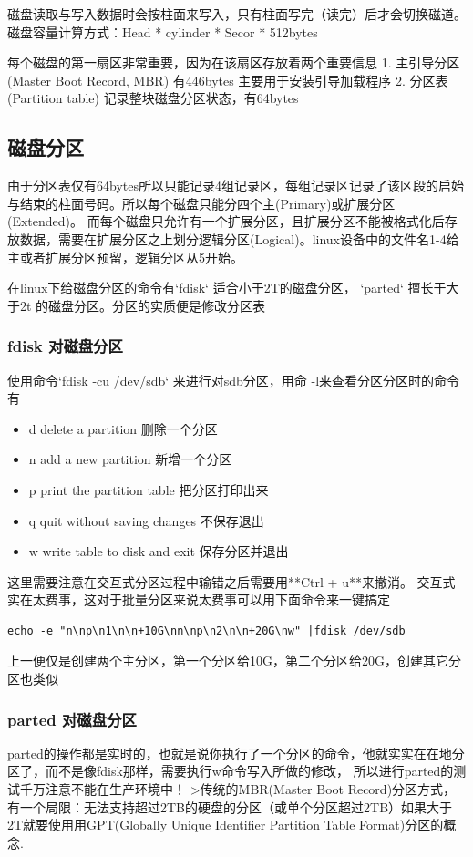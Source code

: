 磁盘读取与写入数据时会按柱面来写入，只有柱面写完（读完）后才会切换磁道。
磁盘容量计算方式：Head * cylinder * Secor * 512bytes

每个磁盘的第一扇区非常重要，因为在该扇区存放着两个重要信息
1. 主引导分区(Master Boot Record, MBR) 有446bytes 主要用于安装引导加载程序
2. 分区表(Partition table) 记录整块磁盘分区状态，有64bytes

\subsection{磁盘分区}
由于分区表仅有64bytes所以只能记录4组记录区，每组记录区记录了该区段的启始与结束的柱面号码。所以每个磁盘只能分四个主(Primary)或扩展分区(Extended)。
而每个磁盘只允许有一个扩展分区，且扩展分区不能被格式化后存放数据，需要在扩展分区之上划分逻辑分区(Logical)。linux设备中的文件名1-4给主或者扩展分区预留，逻辑分区从5开始。

在linux下给磁盘分区的命令有`fdisk` 适合小于2T的磁盘分区， `parted` 擅长于大于2t 的磁盘分区。分区的实质便是修改分区表

\subsubsection{ fdisk 对磁盘分区}
使用命令`fdisk -cu /dev/sdb` 来进行对sdb分区，用命 -l来查看分区分区时的命令有

\begin{itemize}
\item  d   delete a partition 删除一个分区
\item  n   add a new partition       新增一个分区
\item  p   print the partition table 把分区打印出来
\item  q   quit without saving changes 不保存退出
\item  w   write table to disk and exit  保存分区并退出
\end{itemize}

这里需要注意在交互式分区过程中输错之后需要用**Ctrl + u**来撤消。 交互式实在太费事，这对于批量分区来说太费事可以用下面命令来一键搞定
\begin{lstlisting}
echo -e "n\np\n1\n\n+10G\nn\np\n2\n\n+20G\nw" |fdisk /dev/sdb
\end{lstlisting}

上一便仅是创建两个主分区，第一个分区给10G，第二个分区给20G，创建其它分区也类似

\subsubsection{ parted 对磁盘分区}
parted的操作都是实时的，也就是说你执行了一个分区的命令，他就实实在在地分区了，而不是像fdisk那样，需要执行w命令写入所做的修改， 所以进行parted的测试千万注意不能在生产环境中！
>传统的MBR(Master Boot Record)分区方式，有一个局限：无法支持超过2TB的硬盘的分区（或单个分区超过2TB）如果大于2T就要使用用GPT(Globally Unique Identifier Partition Table Format)分区的概念.

